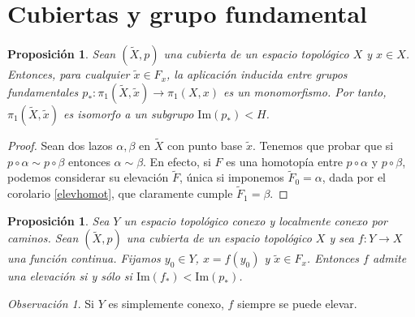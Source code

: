 \documentclass[12pt,a4paper]{book}
\newtheorem{prop}[thm]{Proposición}
\theoremstyle{definition} \newtheorem{defn}[thm]{Definición}
\theoremstyle{definition} \newtheorem{ejemplo}[thm]{Ejemplo}
\theoremstyle{definition} \newtheorem{ejercicio}[thm]{Ejercicio}
\theoremstyle{remark} \newtheorem*{obs}{Observación}
\def\gf{\pi_1}
\def\XX{\tilde{X}}
\def\xx{\tilde{x}}
\def\im{\mathrm{Im}}
\begin{document}
\section{Cubiertas y grupo fundamental}
\begin{prop}
  Sean $(\XX,p)$ una cubierta de un espacio topológico $X$ y $x\in X$. Entonces, para cualquier $\xx \in F_x$, la aplicación inducida entre grupos fundamentales $p_*:\gf(\XX,\xx)\rightarrow \gf(X,x)$ es un monomorfismo. Por tanto, $\gf(\XX,\xx)$ es isomorfo a un subgrupo $\im(p_*)<H$.
\end{prop}
\begin{proof}
  Sean dos lazos $\alpha, \beta$ en $\XX$ con punto base $\xx$. Tenemos que probar que si $p\circ \alpha \sim p\circ \beta$ entonces $\alpha \sim \beta$. En efecto, si $F$ es una homotopía entre $p\circ \alpha$ y $p\circ \beta$, podemos considerar su elevación $\tilde{F}$, única si imponemos $\tilde{F}_0=\alpha$, dada por el corolario \ref{elevhomot}, que claramente cumple $\tilde{F}_1=\beta$.
\end{proof}
\begin{prop}\label{festrella}
  Sea $Y$ un espacio topológico conexo y localmente conexo por caminos. Sean $(\XX,p)$ una cubierta de un espacio topológico $X$ y sea $f:Y\rightarrow X$ una función continua. Fijamos $y_0\in Y$, $x=f(y_0)$ y $\xx \in F_x$. Entonces $f$ admite una elevación si y sólo si
 $\im (f_*) < \im (p_*)$.   
\end{prop}

\begin{obs}
  Si $Y$ es simplemente conexo, $f$ siempre se puede elevar.
\end{obs}
\end{document}
